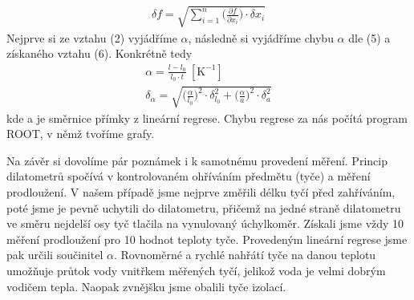 \documentclass{article}
\begin{document}
\begin{align}
\delta f = \sqrt{\sum\limits_{i=1}^n  \Bigg( \frac{\partial f}{\partial  x_{i}} \Bigg)  \cdot \delta x_{i}}
\end{align}
Nejprve si ze vztahu (2) vyjádříme $\alpha$, následně si vyjádříme chybu $\alpha$ dle (5) a získaného vztahu (6).  Konkrétně tedy
\begin{align}
\alpha = \frac{l - l_{0}}{l_{0} \cdot t} \: \mathrm{[K^{-1}]} \\
\delta_{\alpha} = \sqrt{\Bigg(\frac{\alpha}{l_{0}}\Bigg)^{2} \cdot \delta_{l_{0}}^{2} + \Bigg(\frac{\alpha}{a}\Bigg)^{2}  \cdot \delta_{a}^2}
\end{align}
kde a je směrnice přímky z lineární regrese. Chybu regrese za nás počítá program ROOT, v němž tvoříme grafy.
\par Na závěr si dovolíme pár poznámek i k samotnému provedení měření. Princip dilatometrů spočívá v kontrolovaném ohříváním předmětu (tyče) a měření prodloužení. V našem případě jsme nejprve změřili délku tyčí před zahříváním, poté jsme je pevně uchytili do dilatometru, přičemž na jedné straně dilatometru ve směru nejdelší osy tyč tlačila na vynulovaný úchylkoměr. Získali jsme vždy 10 měření prodloužení pro 10 hodnot teploty tyče. Provedeným lineární regrese jsme pak určili součinitel $\alpha$. Rovnoměrné a rychlé nahřátí tyče na danou teplotu umožňuje průtok vody vnitřkem měřených tyčí, jelikož voda je velmi dobrým vodičem tepla. Naopak zvnějšku jsme obalili tyče izolací.
\end{document}
